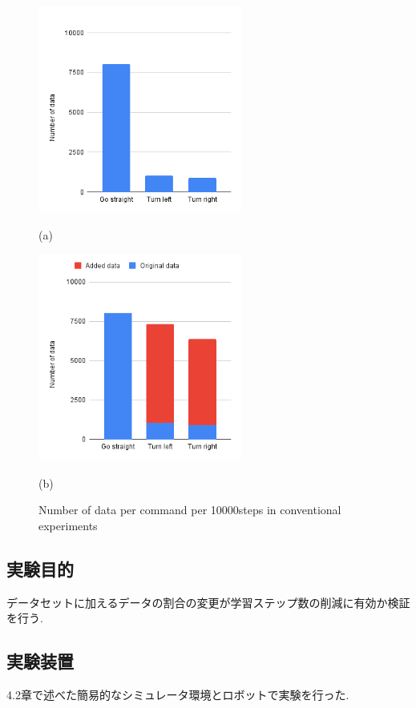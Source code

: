 \begin{figure}[h]
  \centering
  \begin{minipage}[b]{67mm}
    \centering
    \includegraphics[width=67mm]{images/hist_change_org.png}
    \caption*{(a)}
  \end{minipage} 
  \begin{minipage}[b]{67mm}
    \centering
    \includegraphics[width=67mm]{images/hist_change_times7.png}
    \caption*{(b)}
  \end{minipage}
  \caption{Number of data per command per 10000steps in conventional experiments}
  \label{Fig:hist}
\end{figure}

\subsection{実験目的}
データセットに加えるデータの割合の変更が学習ステップ数の削減に有効か検証を行う.
\subsection{実験装置}
4.2章で述べた簡易的なシミュレータ環境とロボットで実験を行った.
